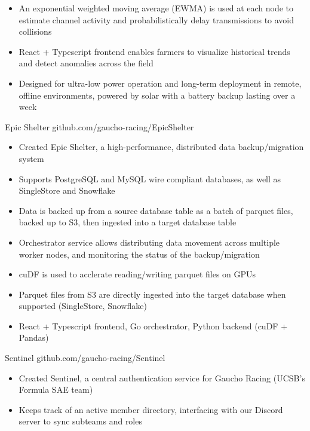 \documentclass[9pt]{developercv} %
\begin{document}
\begin{entrylist}
{\begin{itemize}[noitemsep,topsep=0pt,parsep=0pt,partopsep=0pt, leftmargin=10pt]
            \item An exponential weighted moving average (EWMA) is used at each node to estimate channel activity and probabilistically delay transmissions to avoid collisions
            \item React + Typescript frontend enables farmers to visualize historical trends and detect anomalies across the field
            \item Designed for ultra-low power operation and long-term deployment in remote, offline environments, powered by solar with a battery backup lasting over a week
        \end{itemize}}
    \entry
		{}
		{Epic Shelter}
		{github.com/gaucho-racing/EpicShelter}
		{\vspace{-8pt}
        \begin{itemize}[noitemsep,topsep=0pt,parsep=0pt,partopsep=0pt, leftmargin=10pt]
            \item Created Epic Shelter, a high-performance, distributed data backup/migration system
            \item Supports PostgreSQL and MySQL wire compliant databases, as well as SingleStore and Snowflake
            \item Data is backed up from a source database table as a batch of parquet files, backed up to S3, then ingested into a target database table
            \item Orchestrator service allows distributing data movement across multiple worker nodes, and monitoring the status of the backup/migration
            \item cuDF is used to acclerate reading/writing parquet files on GPUs
            \item Parquet files from S3 are directly ingested into the target database when supported (SingleStore, Snowflake)
            \item React + Typescript frontend, Go orchestrator, Python backend (cuDF + Pandas)
        \end{itemize}}
	\entry
		{}
		{Sentinel}
		{github.com/gaucho-racing/Sentinel}
		{\vspace{-8pt}
        \begin{itemize}[noitemsep,topsep=0pt,parsep=0pt,partopsep=0pt, leftmargin=10pt]
            \item Created Sentinel, a central authentication service for Gaucho Racing (UCSB's Formula SAE team)
            \item Keeps track of an active member directory, interfacing with our Discord server to sync subteams and roles

\end{itemize}}
\end{entrylist}
\end{document}
